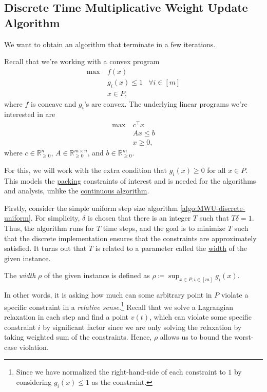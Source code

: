 \subsection{Discrete Time Multiplicative Weight Update Algorithm}
We want to obtain an algorithm that terminate in a few iterations.

\begin{prev}
	Recall that we're working with a convex program
	\[
		\begin{aligned}
			\max~ & f(x)                              \\
			      & g_i(x) \leq 1 & \forall i \in [m] \\
			      & x \in P,
		\end{aligned}
	\]
	where \(f\) is concave and \(g_i\)'s are convex. The underlying linear programs we're interested in are
	\[
		\begin{aligned}
			\max~ & c^{\top} x \\
			      & Ax \leq b  \\
			      & x \geq 0,
		\end{aligned}
	\]
	where \(c \in \mathbb{R} _{\geq 0}^n\), \(A \in \mathbb{R} _{\geq 0}^{m \times n}\), and \(b \in \mathbb{R} _{\geq 0}^m\).
\end{prev}

For this, we will work with the extra condition that \(g_i(x) \geq 0\) for all \(x \in P\). This models the \hyperref[def:packing-LP]{packing} constraints of interest and is needed for the algorithms and analysis, unlike the \hyperref[algo:MWU-continuous]{continuous algorithm}.

Firstly, consider the simple uniform step size algorithm \autoref{algo:MWU-discrete-uniform}. For simplicity, \(\delta \) is chosen that there is an integer \(T\) such that \(T \delta = 1\). Thus, the algorithm runs for \(T\) time steps, and the goal is to minimize \(T\) such that the discrete implementation ensures that the constraints are approximately satisfied. It turns out that \(T\) is related to a parameter called the \hyperref[def:width]{width} of the given instance.

\begin{definition}[Width]\label{def:width}
	The \emph{width} \(\rho \) of the given instance is defined as \(\rho \coloneqq \sup _{x \in P, i \in [m]} g_i(x)\).
\end{definition}

In other words, it is asking how much can some arbitrary point in \(P\) violate a specific constraint in a \emph{relative sense}.\footnote{Since we have normalized the right-hand-side of each constraint to \(1\) by considering \(g_i(x) \leq 1\) as the constraint.} Recall that we solve a Lagrangian relaxation in each step and find a point \(v(t)\), which can violate some specific constraint \(i\) by  significant factor since we are only solving the relaxation by taking weighted sum of the constraints. Hence, \(\rho \) allows us to bound the worst-case violation.

